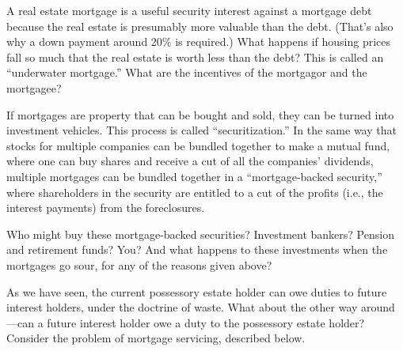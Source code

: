 \item A real estate mortgage is a useful security interest against a mortgage
debt because the real estate is presumably more valuable than the debt. (That's
also why a down payment around 20\% is required.) What happens if housing prices
fall so much that the real estate is worth less than the debt? This is called an
``underwater mortgage.'' What are the incentives of the mortgagor and the
mortgagee?

\item If mortgages are property that can be bought and sold, they can be turned
into investment vehicles. This
process is called
``securitization.'' In the same way
that stocks for multiple companies can be bundled together to make a mutual
fund, where one can buy shares and receive a cut of all the companies'
dividends, multiple mortgages can be bundled together in a ``mortgage-backed
security,'' where shareholders in the security are entitled to a cut of the
profits (i.e., the interest payments) from the
foreclosures.

Who might buy these mortgage-backed securities? Investment bankers? Pension and
retirement funds? You? And what happens to these investments when the mortgages
go sour, for any of the reasons given above?


\item As we have seen, the current possessory estate holder can owe duties to
future interest holders, under the doctrine of waste. What about the other way
around---can a future interest holder owe a duty to the possessory estate
holder? Consider the problem of mortgage servicing, described below.




